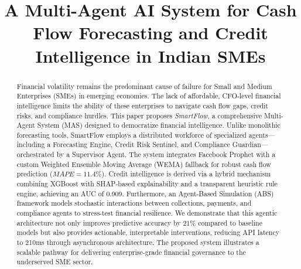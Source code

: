 \documentclass[conference]{IEEEtran}
\begin{document}
\title{A Multi-Agent AI System for Cash Flow Forecasting and Credit Intelligence in Indian SMEs}

\author{
\and
{}
}

\maketitle

\begin{abstract}
Financial volatility remains the predominant cause of failure for Small and Medium Enterprises (SMEs) in emerging economies. The lack of affordable, CFO-level financial intelligence limits the ability of these enterprises to navigate cash flow gaps, credit risks, and compliance hurdles. This paper proposes \textit{SmartFlow}, a comprehensive Multi-Agent System (MAS) designed to democratize financial intelligence. Unlike monolithic forecasting tools, SmartFlow employs a distributed workforce of specialized agents---including a Forecasting Engine, Credit Risk Sentinel, and Compliance Guardian---orchestrated by a Supervisor Agent. The system integrates Facebook Prophet with a custom Weighted Ensemble Moving Average (WEMA) fallback for robust cash flow prediction ($MAPE=11.4\%$). Credit intelligence is derived via a hybrid mechanism combining XGBoost with SHAP-based explainability and a transparent heuristic rule engine, achieving an AUC of 0.909. Furthermore, an Agent-Based Simulation (ABS) framework models stochastic interactions between collections, payments, and compliance agents to stress-test financial resilience. We demonstrate that this agentic architecture not only improves predictive accuracy by 21\% compared to baseline models but also provides actionable, interpretable interventions, reducing API latency to 210ms through asynchronous architecture. The proposed system illustrates a scalable pathway for delivering enterprise-grade financial governance to the underserved SME sector.
\end{abstract}
\end{document}
